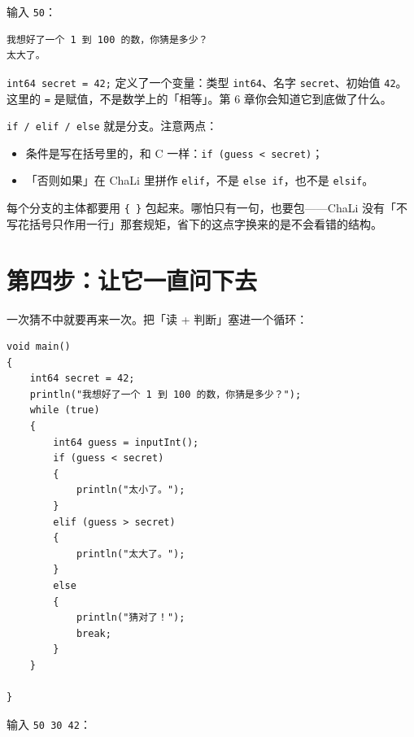 输入 \texttt{50}：

\par
\medskip
\begin{lstlisting}[style=out]
我想好了一个 1 到 100 的数，你猜是多少？
太大了。
\end{lstlisting}
\par
\medskip

\texttt{int64 secret =\allowbreak{} 42;} 定义了一个变量：类型 \texttt{int64}、名字 \texttt{secret}、初始值 \texttt{42}。这里的 \texttt{=\allowbreak{}} 是赋值，不是数学上的「相等」。第 6 章你会知道它到底做了什么。

\texttt{if /\allowbreak{} elif /\allowbreak{} else} 就是分支。注意两点：

\begin{itemize}

\item 条件是写在括号里的，和 C 一样：\texttt{if (\allowbreak{}guess <\allowbreak{} secret)\allowbreak{}}；

\item 「否则如果」在 ChaLi 里拼作 \texttt{elif}，不是 \texttt{else if}，也不是 \texttt{elsif}。

\end{itemize}

每个分支的主体都要用 \texttt{\{ \}} 包起来。哪怕只有一句，也要包——ChaLi 没有「不写花括号只作用一行」那套规矩，省下的这点字换来的是不会看错的结构。

\section{第四步：让它一直问下去}

一次猜不中就要再来一次。把「读 + 判断」塞进一个循环：

\par
\medskip
\begin{lstlisting}[style=chali]
void main()
{
    int64 secret = 42;
    println("我想好了一个 1 到 100 的数，你猜是多少？");
    while (true)
    {
        int64 guess = inputInt();
        if (guess < secret)
        {
            println("太小了。");
        }
        elif (guess > secret)
        {
            println("太大了。");
        }
        else
        {
            println("猜对了！");
            break;
        }
    }

}
\end{lstlisting}
\par
\medskip

输入 \texttt{50 30 42}：

